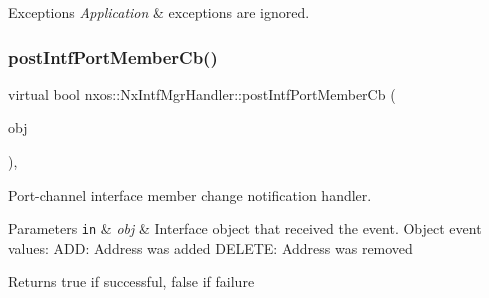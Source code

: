 \begin{DoxyExceptions}{Exceptions}
{\em Application} & exceptions are ignored. \\
\hline
\end{DoxyExceptions}
\mbox{\label{classnxos_1_1_nx_intf_mgr_handler_ae3a76ba4fb97b941d9f11e9210d89a94}} 
\subsubsection{\texorpdfstring{post\+Intf\+Port\+Member\+Cb()}{postIntfPortMemberCb()}}
{\footnotesize\ttfamily virtual bool nxos\+::\+Nx\+Intf\+Mgr\+Handler\+::post\+Intf\+Port\+Member\+Cb (\begin{DoxyParamCaption}\item[{\mbox{\hyperlink{classnxos_1_1_nx_intf}{Nx\+Intf}} $\ast$}]{obj }\end{DoxyParamCaption})\hspace{0.3cm}{\ttfamily [inline]}, {\ttfamily [virtual]}}

Port-\/channel interface member change notification handler. 
\begin{DoxyParams}[1]{Parameters}
\mbox{\tt in}  & {\em obj} & Interface object that received the event. Object event values\+: A\+DD\+: Address was added D\+E\+L\+E\+TE\+: Address was removed \\
\hline
\end{DoxyParams}
\begin{DoxyReturn}{Returns}
true if successful, false if failure
\end{DoxyReturn}

